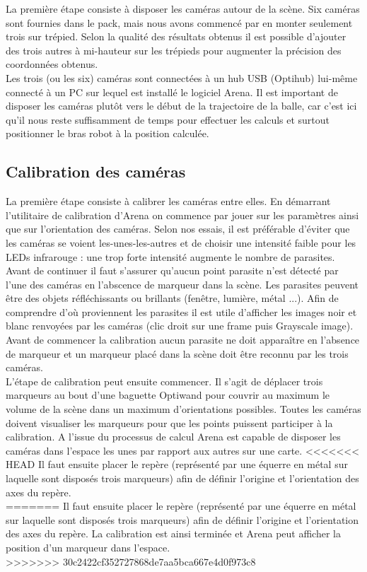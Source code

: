 \documentclass{article}[11pt]
\begin{document}
La première étape consiste à disposer les caméras autour de la scène. Six caméras sont fournies dans le pack, mais nous avons commencé par en monter seulement trois sur trépied. Selon la qualité des résultats obtenus il est possible d'ajouter des trois autres à mi-hauteur sur les trépieds pour augmenter la précision des coordonnées obtenus. \\

Les trois (ou les six) caméras sont connectées à un hub USB (Optihub) lui-même connecté à un PC sur lequel est installé le logiciel Arena. Il est important de disposer les caméras plutôt vers le début de la trajectoire de la balle, car c'est ici qu'il nous reste suffisamment de temps pour effectuer les calculs et surtout positionner le bras robot à la position calculée. \\

\subsection{Calibration des caméras}

La première étape consiste à calibrer les caméras entre elles. En démarrant l'utilitaire de calibration d'Arena on commence par jouer sur les paramètres ainsi que sur l'orientation des caméras. Selon nos essais, il est préférable d'éviter que les caméras se voient les-unes-les-autres et de choisir une intensité faible pour les LEDs infrarouge : une trop forte intensité augmente le nombre de parasites. Avant de continuer il faut s'assurer qu'aucun point parasite n'est détecté par l'une des caméras en l'abscence de marqueur dans la scène. Les parasites peuvent être des objets réfléchissants ou brillants (fenêtre, lumière, métal ...). Afin de comprendre d'où proviennent les parasites il est utile d'afficher les images noir et blanc renvoyées par les caméras (clic droit sur une frame puis Grayscale image). Avant de commencer la calibration aucun parasite ne doit apparaître en l'absence de marqueur et un marqueur placé dans la scène doit être reconnu par les trois caméras. \\

L'étape de calibration peut ensuite commencer. Il s'agit de déplacer trois marqueurs au bout d'une baguette Optiwand pour couvrir au maximum le volume de la scène dans un maximum d'orientations possibles. Toutes les caméras doivent visualiser les marqueurs pour que les points puissent participer à la calibration. A l'issue du processus de calcul Arena est capable de disposer les caméras dans l'espace les unes par rapport aux autres sur une carte. 
\newpage
<<<<<<< HEAD
Il faut ensuite placer le repère (représenté par une équerre en métal sur laquelle sont disposés trois marqueurs) afin de définir l'origine et l'orientation des axes du repère.\\
=======
Il faut ensuite placer le repère (représenté par une équerre en métal sur laquelle sont disposés trois marqueurs) afin de définir l'origine et l'orientation des axes du repère. La calibration est ainsi terminée et Arena peut afficher la position d'un marqueur dans l'espace.\\
>>>>>>> 30c2422cf352727868de7aa5bca667e4d0f973c8
\end{document}
